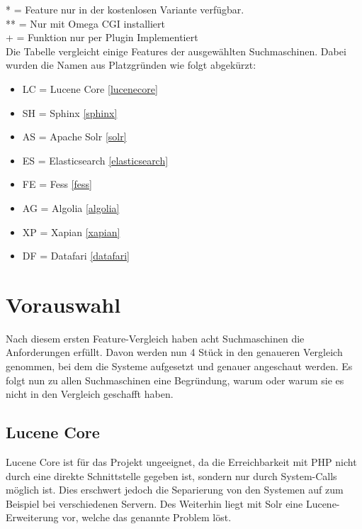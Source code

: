 \begin{table}[hbtp]
    *  = Feature nur in der kostenlosen Variante verfügbar. \\
    ** = Nur mit Omega CGI installiert \\
    + = Funktion nur per Plugin Implementiert \\

    Die Tabelle vergleicht einige Features der ausgewählten Suchmaschinen. Dabei wurden die Namen aus Platzgründen wie folgt abgekürzt:

    \begin{itemize}
        \item LC = Lucene Core \ref{lucenecore}
        \item SH = Sphinx \ref{sphinx}
        \item AS = Apache Solr \ref{solr}
        \item ES = Elasticsearch \ref{elasticsearch}
        \item FE = Fess \ref{fess}
        \item AG = Algolia \ref{algolia}
        \item XP = Xapian \ref{xapian}
        \item DF = Datafari \ref{datafari}
    \end{itemize} 


\end{table}

\section{Vorauswahl}

Nach diesem ersten Feature-Vergleich haben acht Suchmaschinen die Anforderungen erfüllt. Davon werden nun 4 Stück in den genaueren Vergleich genommen, bei dem die Systeme aufgesetzt und genauer angeschaut werden. Es folgt nun zu allen Suchmaschinen eine Begründung, warum oder warum sie es nicht in den Vergleich geschafft haben.

\subsection{Lucene Core}


Lucene Core ist für das Projekt ungeeignet, da die Erreichbarkeit mit PHP nicht durch eine direkte Schnittstelle gegeben ist, sondern nur durch System-Calls möglich ist. Dies erschwert jedoch die Separierung von den Systemen auf zum Beispiel bei verschiedenen Servern. Des Weiterhin liegt mit Solr eine Lucene-Erweiterung vor, welche das genannte Problem löst. \cite{TheApacheSoftwareFoundation.2019b}

